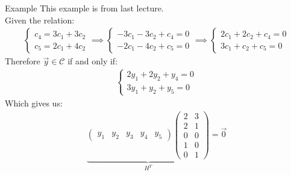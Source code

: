 \begin{parag}{Example}
    This example is from last lecture.\\
    Given the relation:
    \begin{align*} 
        \begin{cases}
            c_4 = 3c_1 + 3c_2 \\ c_5 =  2c_1 + 4c_2
        \end{cases} \implies 
        \begin{cases}
            -3c_1 -3c_2  + c_4 = 0\\
            -2c_1 -4c_2 + c_5 = 0
        \end{cases} \implies 
        \begin{cases}
            2c_1 + 2c_2 + c_4 = 0\\
            3c_1 + c_2 + c_5 = 0
        \end{cases}
    \end{align*}
    Therefore $\vec{y} \in \mathcal{C}$ if and only if:
    \begin{align*} 
        \begin{cases}
            2y_1 + 2y_2 + y_4 = 0\\
            3y_1 + y_2 + y_5 = 0
        \end{cases}
    \end{align*}
    Which gives us:
    \begin{align*} 
        \underbrace{\begin{pmatrix} y_1 & y_2 & y_3 & y_4 & y_5 \end{pmatrix}  \begin{pmatrix} 2 & 3 \\ 2 & 1 \\ 0 & 0 \\ 1  & 0 \\ 0 & 1 \end{pmatrix}}_{H^T} =  \vec{0}
    \end{align*}
\end{parag}
